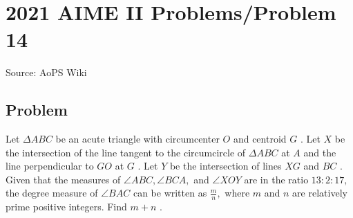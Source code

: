 \documentclass[12pt]{article}
\begin{document}
\section*{{2021 AIME II Problems/Problem 14}}
Source: AoPS Wiki

\subsection*{Problem}
Let $\Delta ABC$ be an acute triangle with circumcenter $O$ and centroid $G$ . Let $X$ be the intersection of the line tangent to the circumcircle of $\Delta ABC$ at $A$ and the line perpendicular to $GO$ at $G$ . Let $Y$ be the intersection of lines $XG$ and $BC$ . Given that the measures of $\angle ABC, \angle BCA,$ and $\angle XOY$ are in the ratio $13 : 2 : 17,$ the degree measure of $\angle BAC$ can be written as $\frac{m}{n},$ where $m$ and $n$ are relatively prime positive integers. Find $m+n$ .
\end{document}
